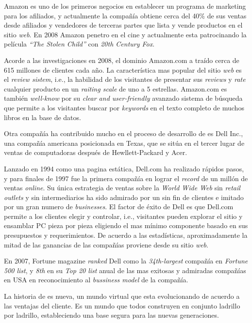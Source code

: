 Amazon es uno de los primeros negocios \ecommerce en establecer un programa de marketing para los afiliados, y actualmente la compañía obtiene cerca del 40\% de sus ventas desde afiliados y vendedores de terceras partes que lista y vende productos en el sitio \textit{web}. En 2008 Amazon penetro en el cine y actualmente esta patrocinando la película \textit{“The Stolen Child”} con \textit{20th Century Fox}.

Acorde a las investigaciones en 2008, el dominio Amazon.com a traído cerca de 615 millones de clientes cada año. La característica mas popular del sitio \textit{web} es el \textit{review sistem}, i.e., la habilidad de los visitantes de presentar sus \textit{reviews} y \textit{rate} cualquier producto en un \textit{raiting scale} de uno a 5 estrellas. Amazon.com es también \textit{well-know} por su \textit{clear and user-friendly} avanzado sistema de búsqueda que permite a los visitantes buscar por \textit{keywords} en el texto completo de muchos libros en la base de datos.

Otra compañía ha contribuido mucho en el proceso de desarrollo de \ecommerce es Dell Inc., una compañía americana posicionada en Texas, que se sitúa en el tercer lugar de ventas de computadoras después de Hewllett-Packard y Acer.

Lanzado en 1994 como una pagina estática, Dell.com ha realizado rápidos pasos, y para finales de 1997 fue la primera compañía en lograr el \textit{record} de un millón de ventas \textit{online}. Su única estrategia de ventas sobre la \textit{World Wide Web} sin \textit{retail outlets} y sin intermediarios ha sido admirado por un sin fin de clientes e imitado por un gran numero de \ecommerce \textit{businesses}. El factor de éxito de Dell es que Dell.com permite a los clientes elegir y controlar, i.e., visitantes pueden explorar el sitio y ensamblar PC pieza por pieza eligiendo el mas mínimo componente basado en sus presupuestos y requerimientos. De acuerdo a las estadísticas, aproximadamente la mitad de las ganancias de las compañías proviene desde su sitio \textit{web}.

En 2007, Fortune magazine \textit{ranked} Dell como la \textit{34th-largest} compañía en \textit{Fortune 500 list}, y \textit{8th} en su \textit{Top 20 list} anual de las mas exitosas y admiradas compañías en USA en reconocimiento al \textit{bussiness model} de la compañía.

La historia de \ecommerce es nueva, un mundo virtual que esta evolucionando de acuerdo a las ventajas del cliente. Es un mundo que todos construyen en conjunto ladrillo por ladrillo, estableciendo una base segura para las nuevas generaciones.

